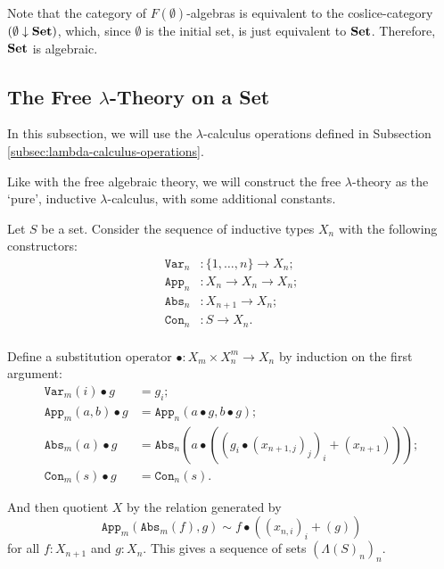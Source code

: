 \begin{remark}\label{rem:free-theory-algebra-set}
  Note that the category of $ F(\emptyset) $-algebras is equivalent to the coslice-category $ (\emptyset \downarrow \mathbf{Set}) $, which, since $ \emptyset $ is the initial set, is just equivalent to $ \mathbf{Set} $. Therefore, $ \mathbf{Set} $ is algebraic.
\end{remark}

\subsection{The Free \texorpdfstring{$ \lambda $}{lambda}-Theory on a Set}

In this subsection, we will use the $ \lambda $-calculus operations defined in Subsection \ref{subsec:lambda-calculus-operations}.

Like with the free algebraic theory, we will construct the free $ \lambda $-theory as the `pure', inductive $ \lambda $-calculus, with some additional constants.

Let $ S $ be a set. Consider the sequence of inductive types $ X_n $ with the following constructors:
\begin{align*}
  \mathtt{Var}_n &: \{ 1, \dots, n \} \to X_n;\\
  \mathtt{App}_n &: X_n \to X_n \to X_n;\\
  \mathtt{Abs}_n &: X_{n + 1} \to X_n;\\
  \mathtt{Con}_n &: S \to X_n.\\
\end{align*}

Define a substitution operator $ \bullet: X_m \times X_n^m \to X_n $ by induction on the first argument:
\begin{align*}
  \mathtt{Var}_m(i) \bullet g &= g_i;\\
  \mathtt{App}_m(a, b) \bullet g &= \mathtt{App}_n(a \bullet g, b \bullet g);\\
  \mathtt{Abs}_m(a) \bullet g &= \mathtt{Abs}_n(a \bullet ((g_i \bullet (x_{n + 1, j})_j)_i + (x_{n + 1})));\\
  \mathtt{Con}_m(s) \bullet g &= \mathtt{Con}_n(s).
\end{align*}

And then quotient $ X $ by the relation generated by
\[ \mathtt{App}_m(\mathtt{Abs}_m(f), g) \sim f \bullet ((x_{n, i})_i + (g)) \]
for all $ f: X_{n + 1} $ and $ g: X_n $. This gives a sequence of sets $ (\Lambda(S)_n)_n $.

